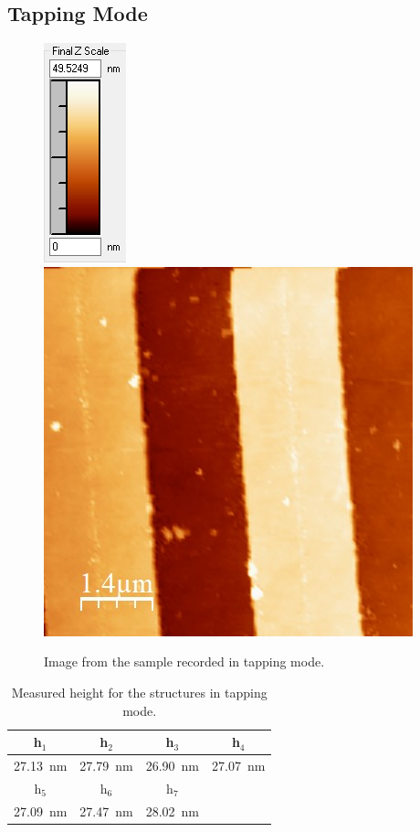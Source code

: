 \documentclass[%
 reprint,
amsmath,amssymb,
pra,
]{revtex4-1}
\begin{document}
\subsection{Tapping Mode}

\begin{figure}
\centering
\includegraphics[scale=0.7]{Bilder/Tapping_Mode/Rohdaten/try3_scalebar.PNG}
\includegraphics[scale=0.5]{Bilder/Tapping_Mode/Rohdaten/try3.JPG}
\caption{Image from the sample recorded in tapping mode.}
\label{fig:Tapping_raw_data}
\end{figure}

\begin{table}[h]
\centering
\begin{tabular}{|c|c|c|c|}
\hline 
h$_1$ & h$_2$ & h$_3$ & h$_4$ \\ 
\hline 
\SI{27.13}{nm} & \SI{27.79}{nm} & \SI{26.90}{nm} & \SI{27.07}{nm}  \\ 
\hline 
h$_5$ & h$_6$ & h$_7$ & \\ 
\hline 
\SI{27.09}{nm} & \SI{27.47}{nm} & \SI{28.02}{nm} &  \\ 
\hline 
\end{tabular} 
\caption{Measured height for the structures in tapping mode.}
\label{tab:Tapping_height}
\end{table}
\end{document}
